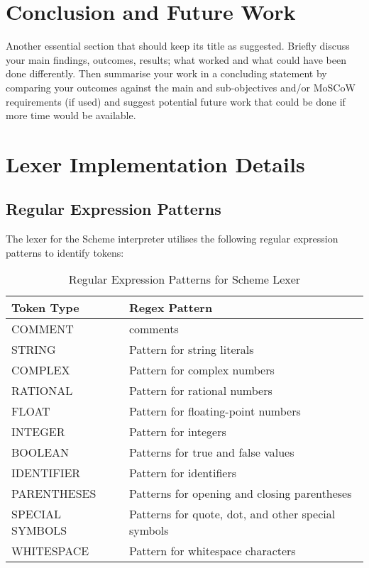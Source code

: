 \documentclass[final]{cmpreport_02}
\begin{document}
\section{Conclusion and Future Work}

Another essential section that should keep its title as suggested. Briefly discuss your main findings, outcomes, results; what worked and what could have been done differently. Then summarise your work in a concluding statement by comparing your outcomes against the main and sub-objectives and/or MoSCoW requirements (if used) and suggest potential future work that could be done if more time would be available.

\clearpage



\appendix
\clearpage
\section{Lexer Implementation Details} \label{app:regex}

\subsection{Regular Expression Patterns}
The lexer for the Scheme interpreter utilises the following regular expression patterns to identify tokens:

\begin{table}[h]
\caption{Regular Expression Patterns for Scheme Lexer}
\label{tab:regexpatterns}
\begin{tabular}{|l|p{10cm}|}
\hline
\textbf{Token Type} & \textbf{Regex Pattern} \\
\hline
COMMENT & comments \\
\hline
STRING & Pattern for string literals \\
\hline
COMPLEX & Pattern for complex numbers \\
\hline
RATIONAL & Pattern for rational numbers \\
\hline
FLOAT & Pattern for floating-point numbers \\
\hline
INTEGER & Pattern for integers \\
\hline
BOOLEAN & Patterns for true and false values \\
\hline
IDENTIFIER & Pattern for identifiers \\
\hline
PARENTHESES & Patterns for opening and closing parentheses \\
\hline
SPECIAL SYMBOLS & Patterns for quote, dot, and other special symbols \\
\hline
WHITESPACE & Pattern for whitespace characters \\
\hline
\end{tabular}
\end{table}
\end{document}
